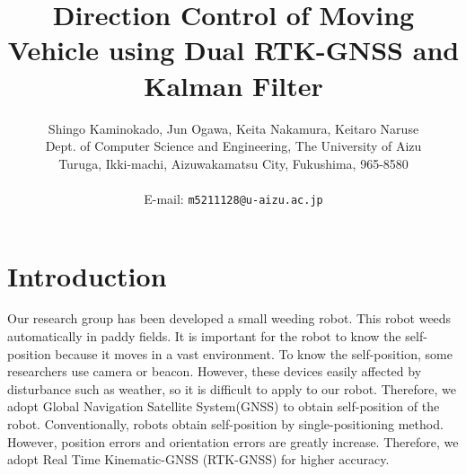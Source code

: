 \documentclass[a4paper]{article}
\begin{document}
\date{}
\title{\LARGE{\bf
Direction Control of Moving Vehicle using Dual RTK-GNSS and Kalman Filter}
}
\author{
Shingo Kaminokado, Jun Ogawa, Keita Nakamura, Keitaro Naruse \\
Dept. of Computer Science and Engineering, The University of Aizu\\
Turuga, Ikki-machi, Aizuwakamatsu City, Fukushima, 965-8580 \\
\\E-mail: \texttt{m5211128@u-aizu.ac.jp}
}

\maketitle
\thispagestyle{empty}


\section{Introduction}
Our research group has been developed a small weeding robot\cite{aigamo}. This robot weeds automatically in paddy fields.
It is important for the robot to know the self-position because it moves in a vast environment. To know the self-position, 
some researchers use camera\cite{camera-relate} or beacon\cite{beacon-relate}. 
However, these devices easily affected by disturbance such as weather, so it is difficult to apply to our robot.
Therefore, we adopt Global Navigation Satellite System(GNSS) to obtain self-position of the robot.
Conventionally, robots obtain self-position by single-positioning method.
However, position errors and orientation errors are greatly increase.
Therefore, we adopt Real Time Kinematic-GNSS (RTK-GNSS) for higher accuracy.
\end{document}
